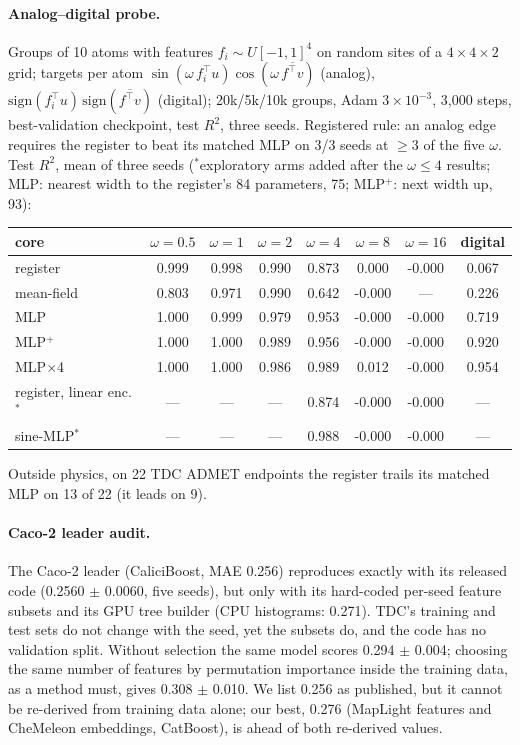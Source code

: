 \documentclass{article}
\newcommand{\AllocTDC}{13 of 22 (it leads on 9)}
\begin{document}
\paragraph{Analog--digital probe.} Groups of 10 atoms with features $f_i \sim U[-1,1]^4$ on random sites of a
$4{\times}4{\times}2$ grid; targets per atom $\sin(\omega\, f_i^\top u)\cos(\omega\,\overline{f^\top v})$ (analog),
$\mathrm{sign}(f_i^\top u)\,\mathrm{sign}(\overline{f^\top v})$ (digital); 20k/5k/10k groups, Adam $3{\times}10^{-3}$, 3{,}000
steps, best-validation checkpoint, test $R^2$, three seeds. Registered rule: an analog edge requires the register to
beat its matched MLP on 3/3 seeds at $\ge 3$ of the five $\omega$. Test $R^2$, mean of three seeds ($^*$exploratory arms added after the $\omega \le 4$ results; MLP: nearest width to the register's 84 parameters, 75; MLP$^+$: next width up, 93):
\begin{center}\footnotesize\setlength{\tabcolsep}{3pt}
\begin{tabular}{lccccccc}
\toprule
core & $\omega{=}0.5$ & $\omega{=}1$ & $\omega{=}2$ & $\omega{=}4$ & $\omega{=}8$ & $\omega{=}16$ & digital \\
\midrule
register & 0.999 & 0.998 & 0.990 & 0.873 & 0.000 & -0.000 & 0.067 \\
mean-field & 0.803 & 0.971 & 0.990 & 0.642 & -0.000 & --- & 0.226 \\
MLP & 1.000 & 0.999 & 0.979 & 0.953 & -0.000 & -0.000 & 0.719 \\
MLP$^{+}$ & 1.000 & 1.000 & 0.989 & 0.956 & -0.000 & -0.000 & 0.920 \\
MLP$\times$4 & 1.000 & 1.000 & 0.986 & 0.989 & 0.012 & -0.000 & 0.954 \\
register, linear enc.$^*$ & --- & --- & --- & 0.874 & -0.000 & -0.000 & --- \\
sine-MLP$^*$ & --- & --- & --- & 0.988 & -0.000 & -0.000 & --- \\
\bottomrule
\end{tabular}\end{center}
Outside physics, on 22 TDC ADMET endpoints the register trails its matched MLP on \AllocTDC{}.

\paragraph{Caco-2 leader audit.}\label{app:caco2}
The Caco-2 leader (CaliciBoost, MAE 0.256) reproduces exactly with its released code (0.2560 $\pm$ 0.0060, five
seeds), but only with its hard-coded per-seed feature subsets and its GPU tree builder (CPU histograms: 0.271). TDC's
training and test sets do not change with the seed, yet the subsets do, and the code has no validation split. Without
selection the same model scores 0.294 $\pm$ 0.004; choosing the same number of features by permutation importance inside
the training data, as a method must, gives 0.308 $\pm$ 0.010. We list 0.256 as published, but it cannot be re-derived from
training data alone; our best, 0.276 (MapLight features and CheMeleon embeddings, CatBoost), is ahead of both re-derived values.
\end{document}
